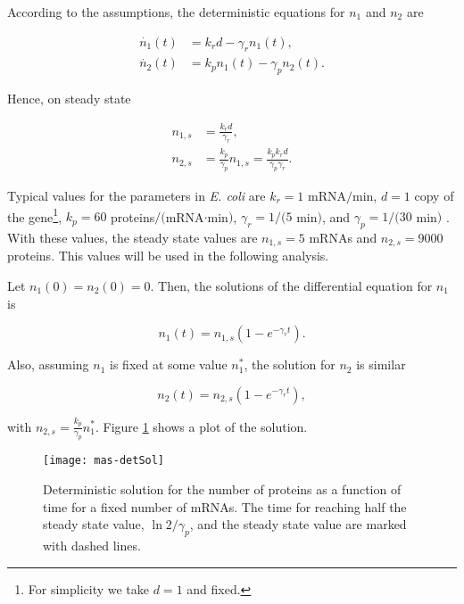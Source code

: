 According to the assumptions, the deterministic equations for $n_1$ and $n_2$ are

\begin{align}
  \dot{n_1}(t) &= k_rd-\gamma_rn_1(t)\label{eq:mas-simple_det_1},\\
  \dot{n_2}(t) &= k_pn_1(t)-\gamma_pn_2(t) \label{eq:mas-simple_det_2}.
\end{align}

Hence, on steady state

\begin{align}
   n_{1,s} &= \frac{k_rd}{\gamma_r} \label{eq:mas-simple_ss_1}, \\
   n_{2,s} &= \frac{k_p}{\gamma_p} n_{1,s} = \frac{k_pk_rd}{\gamma_p\gamma_r} \label{eq:mas-simple_ss_2}.
\end{align}

Typical values for the parameters in \textit{E. coli} are $k_r = 1$ mRNA$/$min, $d=1$ copy of the gene\footnote{For simplicity we take $d=1$ and fixed.}, $k_p = 60$ proteins$/($mRNA$\cdot$min$)$, $\gamma_r = 1/(5$ min$)$, and $\gamma_p = 1/(30$ min$)$ \cite{alon06}. With these values, the steady state values are $n_{1,s}=5$ mRNAs and $n_{2,s}=9000$ proteins. This values will be used in the following analysis.

Let $n_1(0) = n_2(0) = 0$. Then, the solutions of the differential equation for $n_1$ is

\begin{equation*}
  n_1(t) = n_{1,s}\left(1-e^{-\gamma_rt}\right).
\end{equation*}

Also, assuming $n_1$ is fixed at some value $n_1^*$, the solution for $n_2$ is similar

\begin{equation*}
  n_2(t) = n_{2,s}\left(1-e^{-\gamma_rt}\right),
\end{equation*}

with $n_{2,s}=\frac{k_p}{\gamma_p}n_1^*$. Figure \ref{fig:mas-detSol} shows a plot of the solution.

\begin{figure}[H]
  \centering
  \texttt{[image: mas-detSol]}
  \caption[Deterministic solution for the number of proteins]{\label{fig:mas-detSol} Deterministic solution for the number of proteins as a function of time for a fixed number of mRNAs. The time for reaching half the steady state value, $\ln 2/\gamma_p$, and the steady state value are marked with dashed lines.}
\end{figure}

